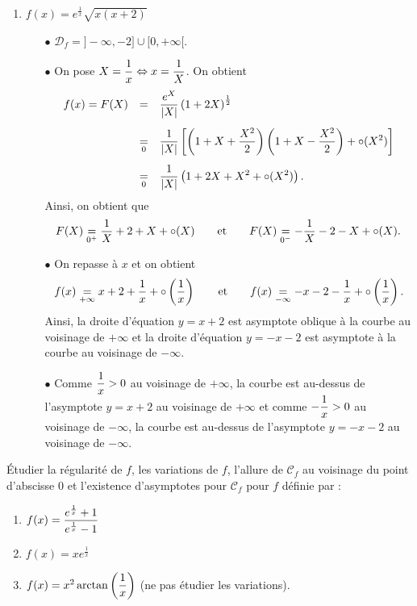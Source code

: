 \documentclass[a4paper, 11pt,reqno]{article}
\begin{document}
\begin{correction}
\begin{enumerate}
		\item $f(x)=e^{\frac{1}{x}}\sqrt{x(x+2)}$
		      \begin{itemize}
			      \item[$\bullet$] $\mathcal{D}_f=\rbrack -\infty,-2\rbrack\cup\lbrack 0,+\infty\lbrack$.
			      \item[$\bullet$] On pose $X=\displaystyle\frac{1}{x}\Leftrightarrow x= \displaystyle\frac{1}{X}$. On obtient
			            $$\begin{array}{lll}
					            f(x)=F(X) & =               & \ddp\frac{e^X}{|X|}\left( 1+2X \right)^{\demi}\vsec                                                                                   \\
					                      & \underset{0}{=} & \ddp\frac{1}{|X|}\left\lbrack \left( 1+X+\ddp\frac{X^2}{2} \right)\left( 1+X-\ddp\frac{X^2}{2} \right)+\circ(X^2)  \right\rbrack\vsec \\
					                      & \underset{0}{=} & \ddp\frac{1}{|X|}\left( 1+2X+X^2+\circ(X^2) \right).
				            \end{array}$$
			            Ainsi, on obtient que
			            $$F(X)\underset{0^+}{=}\displaystyle\frac{1}{X}+2+X+\circ(X)\qquad \hbox{et}\qquad F(X)\underset{0^-}{=}-\displaystyle\frac{1}{X}-2-X+\circ(X).$$
			      \item[$\bullet$]  On repasse \`a $x$ et on obtient
			            $$f(x)\underset{+\infty}{=} x+2+\displaystyle\frac{1}{x}+\circ\left( \displaystyle\frac{1}{x}\right)\qquad \hbox{et}\qquad f(x)\underset{-\infty}{=} -x-2-\displaystyle\frac{1}{x}+\circ\left( \displaystyle\frac{1}{x}\right)            .$$
			            Ainsi, la droite d'\'equation $y=x+2$ est asymptote oblique \`a la courbe au voisinage de $+\infty$ et la droite d'\'equation $y=-x-2$ est asymptote \`a la courbe au voisinage de $-\infty$.
			      \item[$\bullet$] Comme $\displaystyle\frac{1}{x}>0$ au voisinage de $+\infty$, la courbe est au-dessus de l'asymptote $y=x+2$ au voisinage de $+\infty$ et comme $-\displaystyle\frac{1}{x}>0$ au voisinage de $-\infty$, la courbe est au-dessus de l'asymptote $y=-x-2$ au voisinage de $-\infty$.
		      \end{itemize}
	\end{enumerate}
\end{correction}
\begin{exercice}   \; \'Etudier la r\'egularit\'e de $f$, les variations de $f$, l'allure de $\mathcal{C}_f$ au voisinage du point d'abscisse $0$ et l'existence d'asymptotes pour $\mathcal{C}_f$ pour $f$ d\'efinie par :
	\begin{enumerate}
		\item $f(x)= \displaystyle\frac{e^{\frac{1}{x}}+1   }{e^{\frac{1}{x}}-1}$
		\item $f(x) = xe^{\frac{1}{x}}$
		\item $f(x) = x^2\arctan{\left( \displaystyle\frac{1}{x}\right)}$ (ne pas \'etudier les variations).
	\end{enumerate}
\end{exercice}
\end{document}
